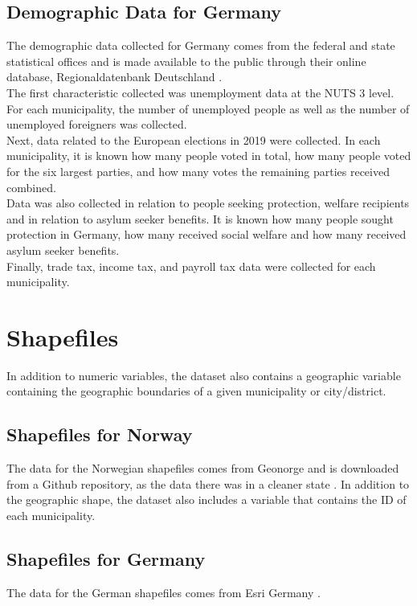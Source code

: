 \subsection{Demographic Data for Germany}
The demographic data collected for Germany comes from the federal and state statistical offices and is made available to the public through their online database, Regionaldatenbank Deutschland \autocite[][]{rdb}. \\
The first characteristic collected was unemployment data at the NUTS 3 level. For each municipality, the number of unemployed people as well as the number of unemployed foreigners was collected. \\
Next, data related to the European elections in 2019 were collected. In each municipality, it is known how many people voted in total, how many people voted for the six largest parties, and how many votes the remaining parties received combined. \\
Data was also collected in relation to people seeking protection, welfare recipients and in relation to asylum seeker benefits. It is known how many people sought protection in Germany, how many received social welfare and how many received asylum seeker benefits. \\
Finally, trade tax, income tax, and payroll tax data were collected for each municipality. 
\clearpage
\section{Shapefiles}
In addition to numeric variables, the dataset also contains a geographic variable containing the geographic boundaries of a given municipality or city/district.
\subsection{Shapefiles for Norway}
The data for the Norwegian shapefiles comes from Geonorge \autocite[][]{geonorge} and is downloaded from a Github repository, as the data there was in a cleaner state \autocite[][]{shapeGithub}. In addition to the geographic shape, the dataset also includes a variable that contains the ID of each municipality.
\subsection{Shapefiles for Germany}
The data for the German shapefiles comes from Esri Germany \autocite[][]{esri}.
\clearpage

